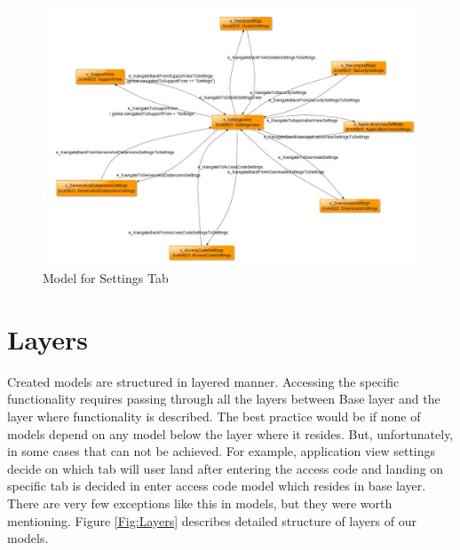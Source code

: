 \begin{figure} [htbp!]
	\centering
					\includegraphics[width=1\textwidth]{figures/Settings_model_screenshot}
					\caption{\label{Fig:Settings_model_screenshot} Model for Settings Tab}
\end{figure}

\section{Layers}
\par
Created models are structured in layered manner. Accessing the specific functionality requires passing through all the layers between Base layer and the layer where functionality is described. The best practice would be if none of models depend on any model below the layer where it resides. But, unfortunately, in some cases that can not be achieved. For example, application view settings decide on which tab will user land after entering the access code and landing on specific tab is decided in enter access code model which resides in base layer. There are very few exceptions like this in models, but they were worth mentioning. Figure \ref{Fig:Layers} describes detailed structure of layers of our models.

